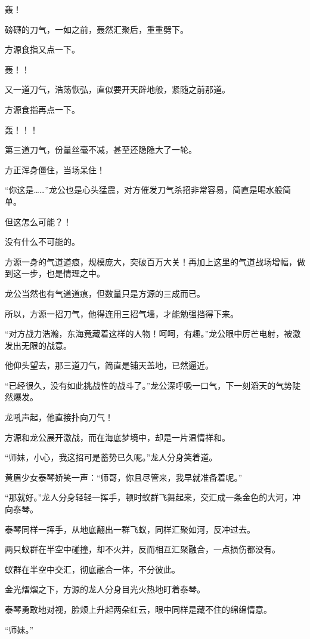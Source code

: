 \begin{this_body}
轰！

磅礴的刀气，一如之前，轰然汇聚后，重重劈下。

方源食指又点一下。

轰！！

又一道刀气，浩荡恢弘，直似要开天辟地般，紧随之前那道。

方源食指再点一下。

轰！！！

第三道刀气，份量丝毫不减，甚至还隐隐大了一轮。

方正浑身僵住，当场呆住！

“你这是……”龙公也是心头猛震，对方催发刀气杀招非常容易，简直是喝水般简单。

但这怎么可能？！

没有什么不可能的。

方源一身的气道道痕，规模庞大，突破百万大关！再加上这里的气道战场增幅，做到这一步，也是情理之中。

龙公当然也有气道道痕，但数量只是方源的三成而已。

所以，方源一招刀气，他得连用三招气墙，才能勉强挡得下来。

“对方战力浩瀚，东海竟藏着这样的人物！呵呵，有趣。”龙公眼中厉芒电射，被激发出无限的战意。

他仰头望去，那三道刀气，简直是铺天盖地，已然逼近。

“已经很久，没有如此挑战性的战斗了。”龙公深呼吸一口气，下一刻滔天的气势陡然爆发。

龙吼声起，他直接扑向刀气！

方源和龙公展开激战，而在海底梦境中，却是一片温情祥和。

“师妹，小心，我这招可是蓄势已久呢。”龙人分身笑着道。

黄眉少女泰琴娇笑一声：“师哥，你且尽管来，我早就准备着呢。”

“那就好。”龙人分身轻轻一挥手，顿时蚁群飞舞起来，交汇成一条金色的大河，冲向泰琴。

泰琴同样一挥手，从地底翻出一群飞蚁，同样汇聚如河，反冲过去。

两只蚁群在半空中碰撞，却不火并，反而相互汇聚融合，一点损伤都没有。

蚁群在半空中交汇，彻底融合一体，不分彼此。

金光熠熠之下，方源的龙人分身目光火热地盯着泰琴。

泰琴勇敢地对视，脸颊上升起两朵红云，眼中同样是藏不住的绵绵情意。

“师妹。”


\end{this_body}
